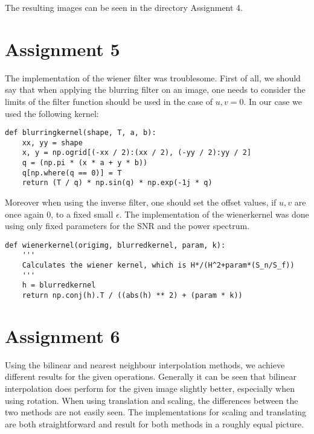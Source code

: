 The resulting images can be seen in the directory Assignment 4.

\section{Assignment 5}
The implementation of the wiener filter was troublesome.
First of all, we should say that when applying the blurring filter on an image, one needs to consider the limits of the filter function should be used in the case of $u,v = 0$.
In our case we used the following kernel:
\begin{verbatim}
def blurringkernel(shape, T, a, b):
    xx, yy = shape
    x, y = np.ogrid[(-xx / 2):(xx / 2), (-yy / 2):yy / 2]
    q = (np.pi * (x * a + y * b))
    q[np.where(q == 0)] = T
    return (T / q) * np.sin(q) * np.exp(-1j * q)
\end{verbatim}

Moreover when using the inverse filter, one should set the offset values, if $u,v$ are once again $0$, to a fixed small $\epsilon$.
The implementation of the wienerkernel was done using only fixed parameters for the SNR and the power spectrum.

\begin{verbatim}
def wienerkernel(origimg, blurredkernel, param, k):
    '''
    Calculates the wiener kernel, which is H*/(H^2+param*(S_n/S_f))
    '''
    h = blurredkernel
    return np.conj(h).T / ((abs(h) ** 2) + (param * k))
\end{verbatim}

\section{Assignment 6}

Using the bilinear and nearest neighbour interpolation methods, we achieve different results for the given operations. 
Generally it can be seen that bilinear interpolation does perform for the given image slightly better, especially when using rotation.
When using translation and scaling, the differences between the two methods are not easily seen. The implementations for scaling and translating are both straightforward and result for both methods in a roughly equal picture.

